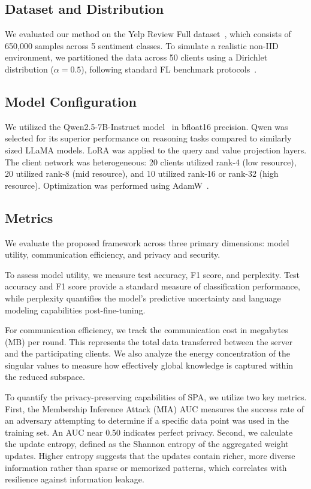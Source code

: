 \documentclass[conference]{IEEEtran}
\begin{document}
\subsection{Dataset and Distribution}

We evaluated our method on the Yelp Review Full dataset~\cite{zhang2015yelp}, which consists of 650,000 samples across 5 sentiment classes. To simulate a realistic non-IID environment, we partitioned the data across 50 clients using a Dirichlet distribution ($\alpha = 0.5$), following standard FL benchmark protocols~\cite{hsu2019measuring, caldas2018leaf}.

\subsection{Model Configuration}

We utilized the Qwen2.5-7B-Instruct model~\cite{bai2023qwen, yang2024qwen2} in bfloat16 precision. Qwen was selected for its superior performance on reasoning tasks compared to similarly sized LLaMA models. LoRA was applied to the query and value projection layers. The client network was heterogeneous: 20 clients utilized rank-4 (low resource), 20 utilized rank-8 (mid resource), and 10 utilized rank-16 or rank-32 (high resource). Optimization was performed using AdamW~\cite{loshchilov2017decoupled}.

\subsection{Metrics}

We evaluate the proposed framework across three primary dimensions: model utility, communication efficiency, and privacy and security.

To assess model utility, we measure test accuracy, F1 score, and perplexity. Test accuracy and F1 score provide a standard measure of classification performance, while perplexity quantifies the model's predictive uncertainty and language modeling capabilities post-fine-tuning.

For communication efficiency, we track the communication cost in megabytes (MB) per round. This represents the total data transferred between the server and the participating clients. We also analyze the energy concentration of the singular values to measure how effectively global knowledge is captured within the reduced subspace.

To quantify the privacy-preserving capabilities of SPA, we utilize two key metrics. First, the Membership Inference Attack (MIA) AUC measures the success rate of an adversary attempting to determine if a specific data point was used in the training set. An AUC near 0.50 indicates perfect privacy. Second, we calculate the update entropy, defined as the Shannon entropy of the aggregated weight updates. Higher entropy suggests that the updates contain richer, more diverse information rather than sparse or memorized patterns, which correlates with resilience against information leakage.
\end{document}
